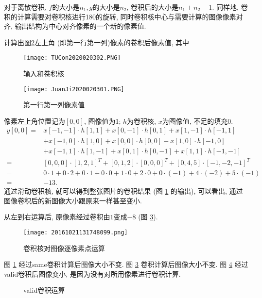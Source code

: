 对于离散卷积, $f$的大小是$n_1, g$的大小是$n_2$, 卷积后的大小是$n_1+n_2-1$.
同样地, 卷积的计算需要对卷积核进行180的旋转, 同时卷积核中心与需要计算的图像像素对齐, 输出结构为中心对齐像素的一个新的像素值.
\begin{example}
计算出图\ref{JuanJi2020020301}左上角 (即第一行第一列)像素的卷积后像素值, 其中
\begin{figure}[H]
\centering
\texttt{[image: TUCon2020020302.PNG]}
\caption{输入和卷积核}
\label{TUCon2020020302}
\end{figure}
\begin{figure}[H]
\centering
\texttt{[image: JuanJi2020020301.PNG]}
\caption{第一行第一列像素值}
\label{JuanJi2020020301}
\end{figure}
像素左上角位置记为$[0,0]$, 图像值为1; $h$为卷积核, $x$为图像值, 不足的填充0.
$$
\begin{aligned}
y[0,0]=& x[-1,-1] \cdot h[1,1]+x[0,-1] \cdot h[0,1]+x[1,-1] \cdot h[-1,1] \\
       &+x[-1,0] \cdot h[1,0]+x[0,0] \cdot h[0,0]+x[1,0] \cdot h[-1,0] \\
       &+x[-1,1] \cdot h[1,-1]+x[0,1] \cdot h[0,-1]+x[1,1] \cdot h[-1,-1] \\
      =&[0,0,0]\cdot [1,2,1]^T+[0,1,2]\cdot [0,0,0]^T+[0,4,5]\cdot [-1,-2,-1]^T\\
      =& 0\cdot 1+0 \cdot 2+0 \cdot 1+0 \cdot 0+1 \cdot 0+2 \cdot 0+0 \cdot (-1)+4 \cdot (-2)+5 \cdot (-1)\\
      =&-13.
\end{aligned}$$
通过滑动卷积核, 就可以得到整张图片的卷积结果 (图 \ref{TUCon2020020302} 的输出), 可以看出, 通过图像卷积后的新图像大小跟原来一样甚至变小.
\vspace{-0.4cm}
\end{example}

\begin{example}
从左到右运算后, 原像素经过卷积由$1$变成$-8$ (图 \ref{CNN20161021131748099}).
\begin{figure}[H]
\centering
\texttt{[image: 20161021131748099.png]}
\caption{卷积核对图像逐像素点运算}
\label{CNN20161021131748099}
\end{figure}
\vspace{-0.4cm}
\end{example}

图 \ref{TUCon2020020302} 经过same卷积计算后图像大小不变.
图 \ref{CNN20161021131748099} 卷积计算后图像大小不变.
图 \ref{20161021135241205} 经过valid卷积后图像变小, 是因为没有对所用像素进行卷积计算.
\begin{figure}[H]
\centering
{}
\caption{valid卷积运算}
\label{20161021135241205}
\end{figure}

